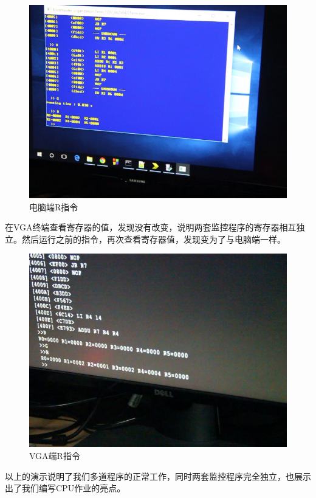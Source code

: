 \begin{figure}[H]
  \includegraphics[width=\linewidth]{Figures/picture/vlcsnap-2015-12-10-00h19m17s659.png}
  \caption{电脑端R指令}
\end{figure}

在VGA终端查看寄存器的值，发现没有改变，说明两套监控程序的寄存器相互独立。然后运行之前的指令，再次查看寄存器值，发现变为了与电脑端一样。

\begin{figure}[H]
  \includegraphics[width=\linewidth]{Figures/picture/vlcsnap-2015-12-10-00h19m57s104.png}
  \caption{VGA端R指令}
\end{figure}

以上的演示说明了我们多道程序的正常工作，同时两套监控程序完全独立，也展示出了我们编写CPU作业的亮点。


